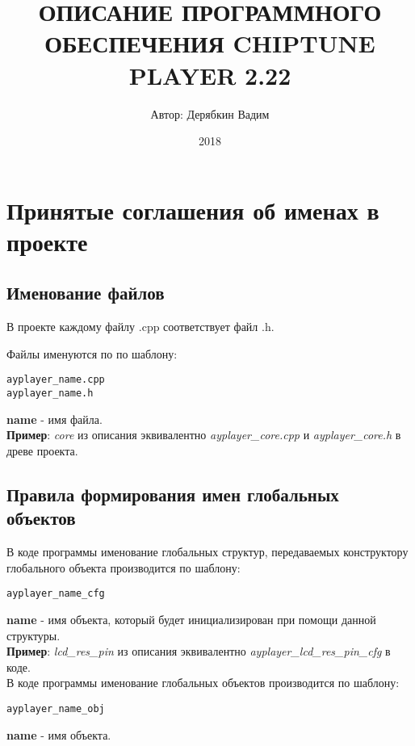 \documentclass[a4paper, 12pt]{article}
\begin{document}
\title {ОПИСАНИЕ ПРОГРАММНОГО ОБЕСПЕЧЕНИЯ CHIPTUNE PLAYER 2.22}
\author {Автор: Дерябкин Вадим}
\date {2018}
\maketitle
\clearpage

\tableofcontents							%
\clearpage									%

\section{Принятые соглашения об именах в проекте}
\subsection{Именование файлов}
В проекте каждому файлу .cpp соответствует файл .h.

Файлы именуются по по шаблону:
\begin{verbatim}
ayplayer_name.cpp
ayplayer_name.h
\end{verbatim}

\textbf{name} - имя файла.\\

\textbf{Пример}: \textit{core} из описания эквивалентно \textit{ayplayer\_core.cpp} и \textit{ayplayer\_core.h} в древе проекта.

\subsection{Правила формирования имен глобальных объектов}
В коде программы именование глобальных структур, передаваемых конструктору глобального объекта производится по шаблону:
\begin{verbatim}ayplayer_name_cfg\end{verbatim}

\textbf{name} - имя объекта, который будет инициализирован при помощи данной структуры.\\

\textbf{Пример}: \textit{lcd\_res\_pin} из описания эквивалентно \textit{ayplayer\_lcd\_res\_pin\_cfg} в коде.\\

В коде программы именование глобальных объектов производится по шаблону:
\begin{verbatim}ayplayer_name_obj\end{verbatim}

\textbf{name} - имя объекта.\\
\end{document}
